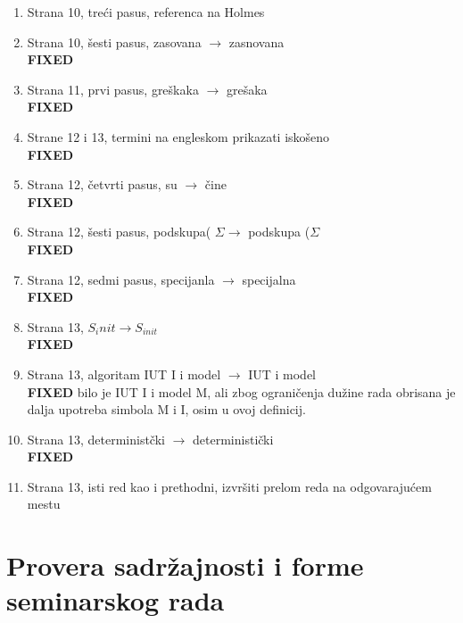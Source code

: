 \documentclass[a4paper]{report}
\begin{document}
\begin{enumerate}
\item Strana 10, treći pasus, referenca na Holmes
\item Strana 10, šesti pasus, zasovana $\rightarrow$ zasnovana
\\ \textbf{FIXED}
\item Strana 11, prvi pasus, greškaka $\rightarrow$ grešaka
\\ \textbf{FIXED}
\item Strane 12 i 13, termini na engleskom prikazati iskošeno
\\ \textbf{FIXED}
\item Strana 12, četvrti pasus, su $\rightarrow$ čine
\\ \textbf{FIXED}
\item Strana 12, šesti pasus, podskupa( $\Sigma \rightarrow$ podskupa ($\Sigma$
\\ \textbf{FIXED}
\item Strana 12, sedmi pasus, specijanla $\rightarrow$ specijalna
\\ \textbf{FIXED}
\item Strana 13, $S_init \rightarrow S_{init}$
\\ \textbf{FIXED}
\item Strana 13, algoritam IUT I i model $\rightarrow$ IUT i model
\\ \textbf{FIXED} bilo je IUT I i model M, ali zbog ograničenja dužine rada obrisana je dalja upotreba simbola M i I, osim u ovoj definicij.
\item Strana 13, deterministčki $\rightarrow$ deterministički
\\ \textbf{FIXED}
\item Strana 13, isti red kao i prethodni, izvršiti prelom reda na odgovarajućem mestu
\end{enumerate}

\section{Provera sadržajnosti i forme seminarskog rada}
\end{document}
